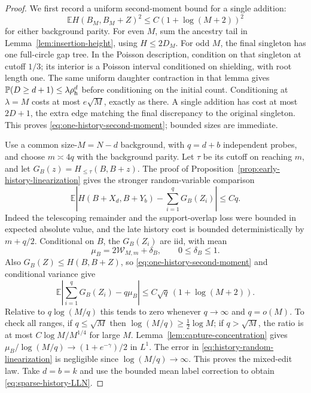 \documentclass[11pt,letterpaper]{article}
\newcommand{\PP}{\mathbb P}\newcommand{\EE}{\mathbb E}
\begin{document}
\begin{proof}
We first record a uniform second-moment bound for a single addition:
\begin{equation}\label{eq:one-history-second-moment}
 \EE H(B_M,B_M+Z)^2\le C(1+\log(M+2))^2
\end{equation}
for either background parity. For even $M$, sum the ancestry tail
in Lemma~\ref{lem:insertion-height}, using $H\le2D_M$.
For odd $M$, the final singleton has one full-circle gap tree.
In the Poisson description, condition on that singleton at cutoff
$1/3$; its interior is a Poisson interval conditioned on shielding,
with root length one. The same uniform daughter contraction in
that lemma gives $\PP(D\ge d+1)\le\lambda\rho_{\rm h}^d$ before
conditioning on the initial count. Conditioning at $\lambda=M$
costs at most $e\sqrt M$, exactly as there. A single addition has
cost at most $2D+1$, the extra edge matching the final discrepancy
to the original singleton. This proves
\eqref{eq:one-history-second-moment}; bounded sizes are immediate.

Use a common size-$M=N-d$ background, with $q=d+b$ independent
probes, and choose $m\asymp4q$ with the background parity.
Let $\tau$ be its cutoff on reaching $m$, and let
$G_B(z)=H_{\le\tau}(B,B+z)$. The proof of
Proposition~\ref{prop:early-history-linearization} gives the stronger
random-variable comparison
\begin{equation}\label{eq:history-random-linearization}
 \EE\left|H(B+X_d,B+Y_b)-\sum_{i=1}^qG_B(Z_i)\right|\le Cq.
\end{equation}
Indeed the telescoping remainder and the support-overlap loss were
bounded in expected absolute value, and the late history cost is
bounded deterministically by $m+q/2$. Conditional on $B$, the
$G_B(Z_i)$ are iid, with mean
\[
 \mu_B=2\mathcal W_{M,m}+\delta_B,\qquad 0\le\delta_B\le1.
\]
Also $G_B(Z)\le H(B,B+Z)$, so
\eqref{eq:one-history-second-moment} and conditional variance give
\[
 \EE\left|\sum_{i=1}^qG_B(Z_i)-q\mu_B\right|
       \le C\sqrt q\,(1+\log(M+2)).
\]
Relative to $q\log(M/q)$ this tends to zero whenever
$q\to\infty$ and $q=o(M)$. To check all ranges, if $q\le\sqrt M$
then $\log(M/q)\ge\tfrac12\log M$; if $q>\sqrt M$, the ratio
is at most $C\log M/M^{1/4}$ for large $M$.
Lemma~\ref{lem:capture-concentration} gives
$\mu_B/\log(M/q)\to(1+e^{-\gamma})/2$ in $L^1$.
The error in \eqref{eq:history-random-linearization} is negligible
since $\log(M/q)\to\infty$. This proves the mixed-edit law.
Take $d=b=k$ and use the bounded mean label correction to obtain
\eqref{eq:sparse-history-LLN}.
\end{proof}
\end{document}
